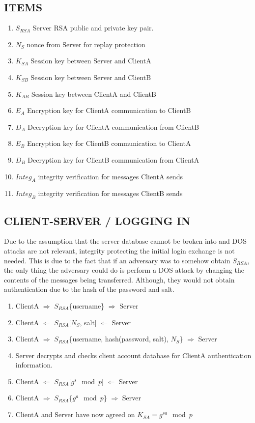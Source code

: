 \documentclass[twoside,letterpaper]{article}
\begin{document}
\subsection{ITEMS}
\begin{enumerate}
\item $S_{RSA}$ Server RSA public and private key pair.
\item $N_{S}$ nonce from Server for replay protection
\item $K_{SA}$  Session key between Server and ClientA
\item $K_{SB}$  Session key between Server and ClientB
\item $K_{AB}$  Session key between ClientA and ClientB
\item $E_{A}$  Encryption key for ClientA communication to ClientB
\item $D_{A}$  Decryption key for ClientA communication from ClientB
\item $E_{B}$  Encryption key for ClientB communication to ClientA
\item $D_{B}$  Decryption key for ClientB communication from ClientA
\item $Integ_{A}$  integrity verification for messages ClientA sends
\item $Integ_{B}$  integrity verification for messages ClientB sends
\end{enumerate}

\bigskip

\subsection{CLIENT-SERVER / LOGGING IN}
Due to the assumption that the server database cannot be broken into and DOS attacks are not relevant, integrity protecting the initial login exchange is not needed. This is due to the fact that if an adversary was to somehow obtain $S_{RSA}$, the only thing the adversary could do is perform a DOS attack by changing the contents of the messages being transferred. Although, they would not obtain authentication due to the hash of the password and salt.

\bigskip

\begin{enumerate}
\item ClientA $\Rightarrow$ $S_{RSA}$\{username\} $\Rightarrow$ Server
\item ClientA $\Leftarrow$ $S_{RSA}$[$N_{S}$, salt] $\Leftarrow$ Server
\item ClientA $\Rightarrow$ $S_{RSA}$\{username, hash(password, salt), $N_{S}$\} $\Rightarrow$ Server
\item Server decrypts and checks client account database for ClientA authentication information.
\item ClientA $\Leftarrow$ $S_{RSA}$[$g^{s}\mod{p}$] $\Leftarrow$ Server
\item ClientA $\Rightarrow$ $S_{RSA}$\{$g^{a}\mod{p}$\} $\Rightarrow$ Server
\item ClientA and Server have now agreed on $K_{SA} = g^{sa}\mod{p}$
\end{enumerate}
 
\end{document}
